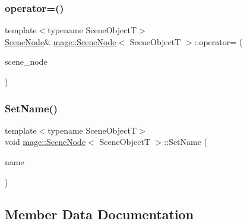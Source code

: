 \hypertarget{classmage_1_1_scene_node_a5fe1aa53e7ac43653483af8397ce78a9}{}\label{classmage_1_1_scene_node_a5fe1aa53e7ac43653483af8397ce78a9} 
\subsubsection{\texorpdfstring{operator=()}{operator=()}\hspace{0.1cm}{\footnotesize\ttfamily [2/2]}}
{\footnotesize\ttfamily template$<$typename Scene\+ObjectT$>$ \\
\hyperlink{classmage_1_1_scene_node}{Scene\+Node}\& \hyperlink{classmage_1_1_scene_node}{mage\+::\+Scene\+Node}$<$ Scene\+ObjectT $>$\+::operator= (\begin{DoxyParamCaption}\item[{\hyperlink{classmage_1_1_scene_node}{Scene\+Node}$<$ Scene\+ObjectT $>$ \&\&}]{scene\+\_\+node }\end{DoxyParamCaption})\hspace{0.3cm}{\ttfamily [delete]}}

\hypertarget{classmage_1_1_scene_node_a9b77104eb1122ebb75fb5bba537bc967}{}\label{classmage_1_1_scene_node_a9b77104eb1122ebb75fb5bba537bc967} 
\subsubsection{\texorpdfstring{Set\+Name()}{SetName()}}
{\footnotesize\ttfamily template$<$typename Scene\+ObjectT$>$ \\
void \hyperlink{classmage_1_1_scene_node}{mage\+::\+Scene\+Node}$<$ Scene\+ObjectT $>$\+::Set\+Name (\begin{DoxyParamCaption}\item[{const string \&}]{name }\end{DoxyParamCaption})}



\subsection{Member Data Documentation}
\hypertarget{classmage_1_1_scene_node_a210a40aa88e7c21d4b506ff78581eb2f}{}\label{classmage_1_1_scene_node_a210a40aa88e7c21d4b506ff78581eb2f} 
